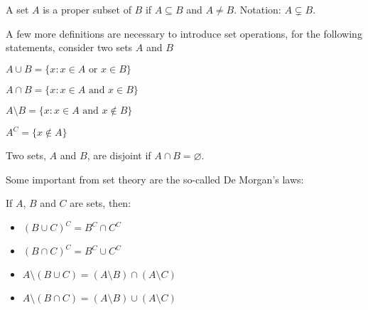 \begin{definition}
    A set $A$ is a proper subset of $B$ if $A \subseteq B$ and $A \neq B$. Notation: $A \subsetneq B$.
\end{definition}

A few more definitions are necessary to introduce set operations, for the following statements, consider two sets $A$ and $B$

\begin{definition}
    $A \cup B = \{ x: x \in A \text{ or } x \in B\}$
\end{definition}

\begin{definition}
    $A \cap B = \{ x: x \in A \text{ and } x \in B\}$
\end{definition}

\begin{definition}
    $A \setminus B = \{ x : x \in A \text { and } x \notin B\}$
\end{definition}

\begin{definition}
    $A^C = \{ x \notin A \}$
\end{definition}

\begin{definition}
    Two sets, $A$ and $B$, are disjoint if $A \cap B = \varnothing$.
\end{definition}

Some important from set theory are the so-called De Morgan's laws:

\begin{theorem}
    If $A$, $B$ and $C$ are sets, then:
    \begin{itemize}
        \item $(B \cup C)^C = B^C \cap C^C$
        \item $(B \cap C)^C = B^C \cup C^C$
        \item $A \setminus (B \cup C) = (A \setminus B) \cap (A \setminus C)$
        \item $A \setminus (B \cap C) = (A \setminus B) \cup (A \setminus C)$
    \end{itemize}
\end{theorem}

